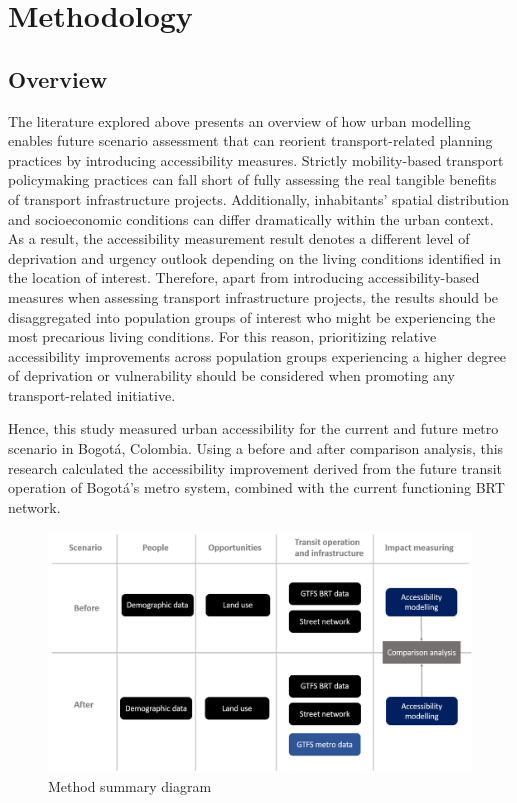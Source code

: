 \documentclass[12pt, a4paper]{report}
\begin{document}
\chapter{Methodology} \label{Chap4}


\section{Overview}

The literature explored above presents an overview of how urban modelling enables future scenario assessment that can reorient transport-related planning practices by introducing accessibility measures. Strictly mobility-based transport policymaking practices can fall short of fully assessing the real tangible benefits of transport infrastructure projects. Additionally, inhabitants' spatial distribution and socioeconomic conditions can differ dramatically within the urban context. As a result, the accessibility measurement result denotes a different level of deprivation and urgency outlook depending on the living conditions identified in the location of interest. Therefore, apart from introducing accessibility-based measures when assessing transport infrastructure projects, the results should be disaggregated into population groups of interest who might be experiencing the most precarious living conditions. For this reason, prioritizing relative accessibility improvements across population groups experiencing a higher degree of deprivation or vulnerability should be considered when promoting any transport-related initiative.


Hence, this study measured urban accessibility for the current and future metro scenario in Bogotá, Colombia. Using a before and after comparison analysis, this research calculated the accessibility improvement derived from the future transit operation of Bogotá's metro system, combined with the current functioning BRT network.

\begin{figure}[H]
    \centering
    \includegraphics[width=16cm]{Images/Method_Summary.png}
    \caption{Method summary diagram}
    \label{fig:Method_Summary}
\end{figure}
\end{document}
